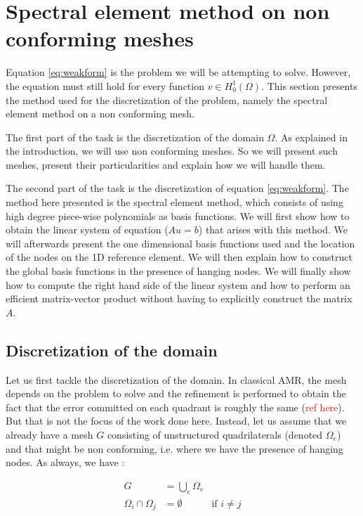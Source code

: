 \section{Spectral element method on non conforming meshes}
Equation \ref{eq:weakform} is the problem we will be attempting to solve. However, the equation must still hold for every function $v \in H_0^1(\Omega)$. This section presents the method used for the discretization of the problem, namely the spectral element method on a non conforming mesh. 

The first part of the task is the discretization of the domain $\Omega$. As explained in the introduction, we will use non conforming meshes. So we will present such meshes, present their particularities and explain how we will handle them.   

The second part of the task is the discretization of equation \ref{eq:weakform}. The method here presented is the spectral element method, which consists of using high degree piece-wise polynomials as basis functions. We will first show how to obtain the linear system of equation ($Au=b$) that arises with this method. We will afterwards present the one dimensional basis functions used and the location of the nodes on the 1D reference element. We will then explain how to construct the global basis functions in the presence of hanging nodes. We will finally show how to compute the right hand side of the linear system and how to perform an efficient matrix-vector product without having to explicitly construct the matrix $A$.

\subsection{Discretization of the domain}

Let us first tackle the discretization of the domain. In classical AMR, the mesh depends on the problem to solve and the refinement is performed to obtain the fact that the error committed on each quadrant is roughly the same (\textcolor{red}{ref here}). But that is not the focus of the work done here. Instead, let us assume that we already have a mesh $G$ consisting of unstructured quadrilaterals (denoted $\Omega_e$) and that might be non conforming, i.e. where we have the presence of hanging nodes. As always, we have : 

\begin{align*}
G &= \bigcup\limits_{e} \Omega_e\\
\Omega_i \cap \Omega_j &= \emptyset &\text{if $i\neq j$}
\end{align*}

